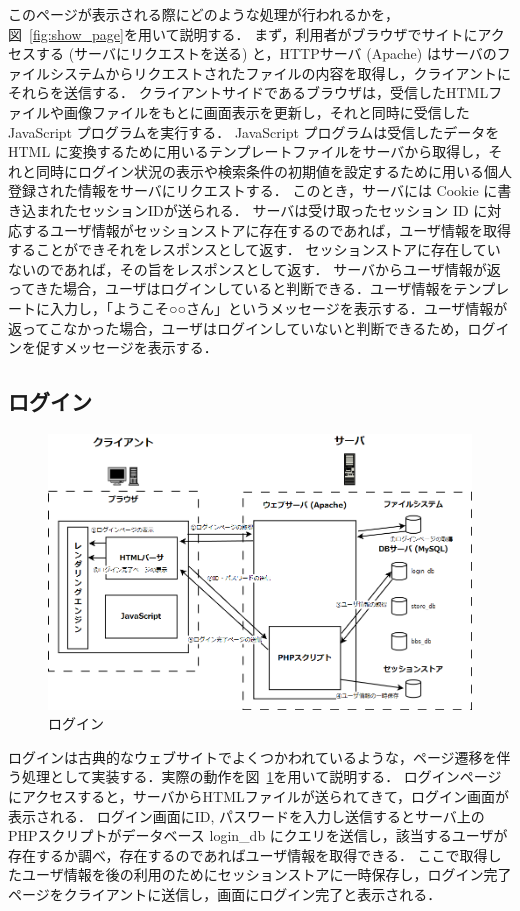 \documentclass[a4paper]{jsarticle}
\begin{document}
このページが表示される際にどのような処理が行われるかを，図~\ref{fig:show_page}を用いて説明する．
まず，利用者がブラウザでサイトにアクセスする (サーバにリクエストを送る) と，HTTPサーバ (Apache) はサーバのファイルシステムからリクエストされたファイルの内容を取得し，クライアントにそれらを送信する．
クライアントサイドであるブラウザは，受信したHTMLファイルや画像ファイルをもとに画面表示を更新し，それと同時に受信した JavaScript プログラムを実行する．
 JavaScript プログラムは受信したデータを HTML に変換するために用いるテンプレートファイルをサーバから取得し，それと同時にログイン状況の表示や検索条件の初期値を設定するために用いる個人登録された情報をサーバにリクエストする．
このとき，サーバには Cookie に書き込まれたセッションIDが送られる．
サーバは受け取ったセッション ID に対応するユーザ情報がセッションストアに存在するのであれば，ユーザ情報を取得することができそれをレスポンスとして返す．
セッションストアに存在していないのであれば，その旨をレスポンスとして返す．
サーバからユーザ情報が返ってきた場合，ユーザはログインしていると判断できる．ユーザ情報をテンプレートに入力し，「ようこそ○○さん」というメッセージを表示する．ユーザ情報が返ってこなかった場合，ユーザはログインしていないと判断できるため，ログインを促すメッセージを表示する．

\subsection{ログイン}
\begin{figure}[htbp]
  \centering
  \includegraphics[width=0.8\linewidth]{../../image/story/2_login}
  \caption{ログイン}
  \label{fig:login}
\end{figure}

ログインは古典的なウェブサイトでよくつかわれているような，ページ遷移を伴う処理として実装する．実際の動作を図~\ref{fig:login}を用いて説明する．
ログインページにアクセスすると，サーバからHTMLファイルが送られてきて，ログイン画面が表示される．
ログイン画面にID, パスワードを入力し送信するとサーバ上のPHPスクリプトがデータベース login\_db にクエリを送信し，該当するユーザが存在するか調べ，存在するのであればユーザ情報を取得できる．
ここで取得したユーザ情報を後の利用のためにセッションストアに一時保存し，ログイン完了ページをクライアントに送信し，画面にログイン完了と表示される．
\end{document}
